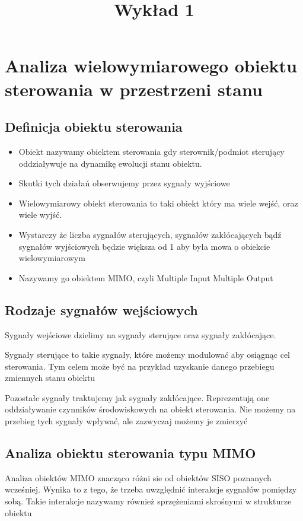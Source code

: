 \documentclass{article}
\title{Wykład 1}
\begin{document}
\maketitle
	\section{Analiza wielowymiarowego obiektu sterowania w przestrzeni stanu}

	\subsection{Definicja obiektu sterowania}
		\begin{itemize}
			\item Obiekt nazywamy obiektem sterowania gdy sterownik/podmiot sterujący oddziaływuje
			na dynamikę ewolucji stanu obiektu.
			\item Skutki tych działań obserwujemy przez sygnały wyjściowe
			\item Wielowymiarowy obiekt sterowania to taki obiekt który ma wiele wejść,
			oraz wiele wyjść.
			\item Wystarczy że liczba sygnałów sterujących, sygnałów zakłócających bądź sygnałów
			wyjściowych będzie większa od 1 aby była mowa o obiekcie wielowymiarowym
			\item Nazywamy go obiektem MIMO, czyli Multiple Input Multiple Output
		\end{itemize}
	\subsection{Rodzaje sygnałów wejściowych}

		Sygnały wejściowe dzielimy na sygnały sterujące oraz sygnały zakłócające.

		Sygnały sterujące to takie sygnały, które możemy modulować aby osiągnąc cel sterowania.
		Tym celem może być na przykład uzyskanie danego przebiegu zmiennych stanu obiektu

		Pozostałe sygnały traktujemy jak sygnały zakłócające. Reprezentują one oddziaływanie
		czynników środowiskowych na obiekt sterowania. Nie możemy na przebieg tych
		sygnały wpływać, ale zazwyczaj możemy je zmierzyć

	\subsection{Analiza obiektu sterowania typu MIMO}

	Analiza obiektów MIMO znacząco różni sie od obiektów SISO poznanych wcześniej.
	Wynika to z tego, że trzeba uwzględnić interakcje sygnałów pomiędzy sobą.
	Takie interakcje nazywamy również sprzężeniami skrośnymi w strukturze obiektu
\end{document}
